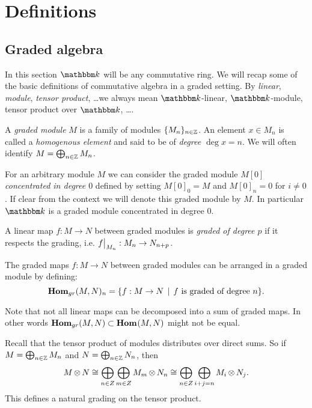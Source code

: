 
\section{Definitions}
\label{sec:definitions}

\subsection{Graded algebra}

In this section $\k$ will be any commutative ring. We will recap some of the basic definitions of commutative algebra in a graded setting. By \emph{linear}, \emph{module}, \emph{tensor product}, \dots we always mean $\k$-linear, $\k$-module, tensor product over $\k$, \dots.

\begin{definition}
	A \emph{graded module} $M$ is a family of modules $\{M_n\}_{n\in\mathbb{Z}}$. An element $x \in M_n$ is called a \emph{homogenous element} and said to be of \emph{degree $\deg{x} = n$}. We will often identify $M = \bigoplus_{n \in \mathbb{Z}} M_n$.
\end{definition}

For an arbitrary module $M$ we can consider the graded module $M[0]$ \emph{concentrated in degree $0$} defined by setting $M[0]_0 = M$ and $M[0]_n = 0$ for $i \neq 0$. If clear from the context we will denote this graded module by $M$. In particular $\k$ is a graded module concentrated in degree $0$.

\begin{definition}
	A linear map $f: M \to N$ between graded modules is \emph{graded of degree $p$} if it respects the grading, i.e. $\restr{f}{M_n} : M_n \to N_{n+p}$.
\end{definition}

\begin{definition}
	The graded maps $f: M \to N$ between graded modules can be arranged in a graded module by defining:
	$$ \mathbf{Hom}_{gr}(M, N)_n = \{ f: M \to N \,\mid\, f \text{ is graded of degree } n \}. $$
\end{definition}

Note that not all linear maps can be decomposed into a sum of graded maps. In other words $\mathbf{Hom}_{gr}(M, N) \subset \mathbf{Hom}_{}(M, N)$ might not be equal.

Recall that the tensor product of modules distributes over direct sums. So if $M = \bigoplus_{n \in \mathbb{Z}} M_n$ and $N = \bigoplus_{n \in \mathbb{Z}} N_n$, then
$$ M \operatorname*{\otimes} N \cong \bigoplus_{n \in Z} \bigoplus_{m \in Z} M_m \operatorname*{\otimes} N_n \cong \bigoplus_{n \in Z} \bigoplus_{i + j = n} M_i \operatorname*{\otimes} N_j. $$
This defines a natural grading on the tensor product.

